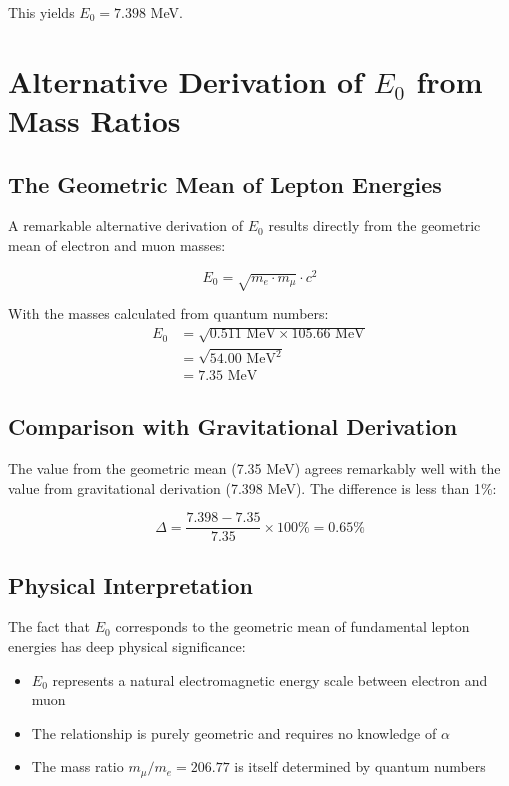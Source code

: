 \documentclass[12pt,a4paper]{article}
\begin{document}
	This yields $E_0 = 7.398$ MeV.
	
	\section{Alternative Derivation of $E_0$ from Mass Ratios}
	
	\subsection{The Geometric Mean of Lepton Energies}
	
	A remarkable alternative derivation of $E_0$ results directly from the geometric mean of electron and muon masses:
	
	\begin{equation}
		E_0 = \sqrt{m_e \cdot m_\mu} \cdot c^2
	\end{equation}
	
	With the masses calculated from quantum numbers:
	\begin{align}
		E_0 &= \sqrt{0.511 \text{ MeV} \times 105.66 \text{ MeV}}\\
		&= \sqrt{54.00 \text{ MeV}^2}\\
		&= 7.35 \text{ MeV}
	\end{align}
	
	\subsection{Comparison with Gravitational Derivation}
	
	The value from the geometric mean (7.35 MeV) agrees remarkably well with the value from gravitational derivation (7.398 MeV). The difference is less than 1\%:
	
	\begin{equation}
		\Delta = \frac{7.398 - 7.35}{7.35} \times 100\% = 0.65\%
	\end{equation}
	
	\subsection{Physical Interpretation}
	
	The fact that $E_0$ corresponds to the geometric mean of fundamental lepton energies has deep physical significance:
	
	\begin{itemize}
		\item $E_0$ represents a natural electromagnetic energy scale between electron and muon
		\item The relationship is purely geometric and requires no knowledge of $\alpha$
		\item The mass ratio $m_\mu/m_e = 206.77$ is itself determined by quantum numbers
	\end{itemize}
	
\end{document}
